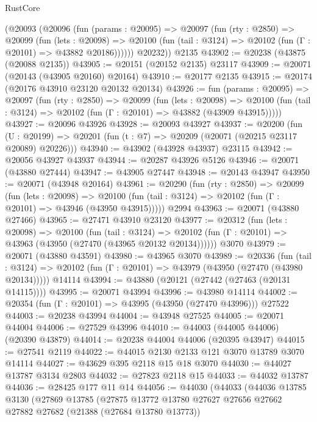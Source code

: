 \begin{lexlean}{RustCore}
\begin{coremodule}
      (@20093
        (@20096
          (fun (params : @20095) =>
          @20097
            (fun (rty : @2850) =>
            @20099
              (fun (lets : @20098) =>
              @20100 (fun (tail : @3124) => @20102 (fun (Γ : @20101) => @43882 @20186))))))
        @20232))
    @2135
@43902 := @20238 (@43875 (@20088 @2135))
@43905 := @20151 (@20152 @2135) @23117
@43909 := @20071 (@20143 (@43905 @20160) @20164)
@43910 := @20177 @2135
@43915 := @20174 (@20176 @43910 @23120 @20132 @20134)
@43926 := fun (params : @20095) =>
  @20097
    (fun (rty : @2850) =>
    @20099
      (fun (lets : @20098) =>
      @20100 (fun (tail : @3124) => @20102 (fun (Γ : @20101) => @43882 (@43909 @43915)))))
@43927 := @20096 @43926
@43928 := @20093 @43927
@43937 := @20200
    (fun (U : @20199) => @20201 (fun (t : @7) => @20209 (@20071 (@20215 @23117 @20089) @20226)))
@43940 := @43902 (@43928 @43937) @23115
@43942 := @20056 @43927 @43937
@43944 := @20287 @43926 @5126
@43946 := @20071 (@43880 @27444)
@43947 := @43905 @27447
@43948 := @20143 @43947
@43950 := @20071 (@43948 @20164)
@43961 := @20290
    (fun (rty : @2850) =>
    @20099
      (fun (lets : @20098) =>
      @20100 (fun (tail : @3124) => @20102 (fun (Γ : @20101) => @43946 (@43950 @43915)))))
    @2994
@43963 := @20071 (@43880 @27466)
@43965 := @27471 @43910 @23120
@43977 := @20312
    (fun (lets : @20098) =>
    @20100
      (fun (tail : @3124) =>
      @20102 (fun (Γ : @20101) => @43963 (@43950 (@27470 (@43965 @20132 @20134))))))
    @3070
@43979 := @20071 (@43880 @43591)
@43980 := @43965 @3070
@43989 := @20336
    (fun (tail : @3124) => @20102 (fun (Γ : @20101) => @43979 (@43950 (@27470 (@43980 @20134)))))
    @14114
@43994 := @43880 (@20121 (@27442 (@27463 (@20131 @14115))))
@43995 := @20071 @43994
@43996 := @43980 @14114
@44002 := @20354 (fun (Γ : @20101) => @43995 (@43950 (@27470 @43996))) @27522
@44003 := @20238 @43994
@44004 := @43948 @27525
@44005 := @20071 @44004
@44006 := @27529 @43996
@44010 := @44003 (@44005 @44006) (@20390 @43879)
@44014 := @20238 @44004 @44006 (@20395 @43947)
@44015 := @27541 @2119
@44022 := @44015 @2130 @2133 @121 @3070 @13789 @3070 @14114
@44027 := @43629 @395 @2118 @15 @18 @3070
@44030 := @44027 @13787 @3134 @2803
@44032 := @27823 @2118 @15
@44033 := @44032 @13787
@44036 := @28425 @177 @11 @14
@44056 := @44030
    (@44033
      (@44036
        @13785
        @3130
        (@27869
          @13785
          (@27875
            @13772
            @13780
            @27627
            @27656
            @27662
            @27882
            @27682
            (@21388 (@27684 @13780 @13773))

\end{coremodule}
\end{lexlean}
